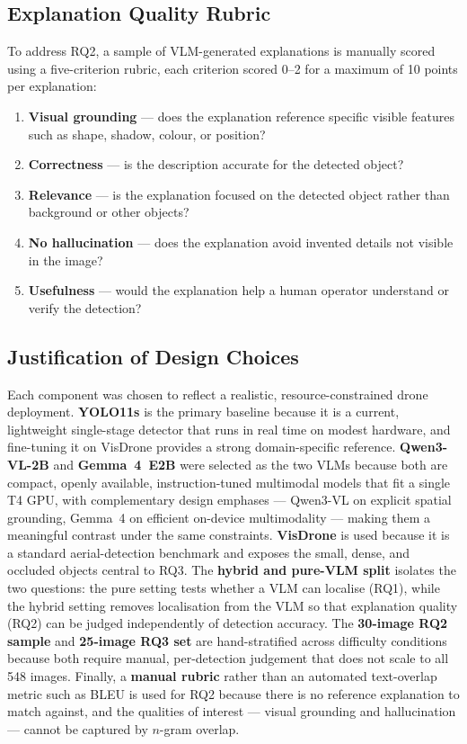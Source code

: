 \documentclass[acmtog, authorversion]{acmart}
\begin{document}
\subsection{Explanation Quality Rubric}

To address RQ2, a sample of VLM-generated explanations is manually
scored using a five-criterion rubric, each criterion scored 0--2
for a maximum of 10 points per explanation:

\begin{enumerate}
  \item \textbf{Visual grounding} --- does the explanation reference
    specific visible features such as shape, shadow, colour, or
    position?
  \item \textbf{Correctness} --- is the description accurate for the
    detected object?
  \item \textbf{Relevance} --- is the explanation focused on the
    detected object rather than background or other objects?
  \item \textbf{No hallucination} --- does the explanation avoid
    invented details not visible in the image?
  \item \textbf{Usefulness} --- would the explanation help a human
    operator understand or verify the detection?
\end{enumerate}

\subsection{Justification of Design Choices}
Each component was chosen to reflect a realistic, resource-constrained
drone deployment. \textbf{YOLO11s} is the primary baseline because it
is a current, lightweight single-stage detector that runs in real time
on modest hardware, and fine-tuning it on VisDrone provides a strong
domain-specific reference. \textbf{Qwen3-VL-2B} and \textbf{Gemma~4~E2B}
were selected as the two VLMs because both are compact, openly
available, instruction-tuned multimodal models that fit a single T4
GPU, with complementary design emphases --- Qwen3-VL on explicit
spatial grounding, Gemma~4 on efficient on-device multimodality ---
making them a meaningful contrast under the same constraints.
\textbf{VisDrone} is used because it is a standard aerial-detection
benchmark and exposes the small, dense, and occluded objects central to
RQ3. The \textbf{hybrid and pure-VLM split} isolates the two questions:
the pure setting tests whether a VLM can localise (RQ1), while the
hybrid setting removes localisation from the VLM so that explanation
quality (RQ2) can be judged independently of detection accuracy. The
\textbf{30-image RQ2 sample} and \textbf{25-image RQ3 set} are
hand-stratified across difficulty conditions because both require
manual, per-detection judgement that does not scale to all 548 images.
Finally, a \textbf{manual rubric} rather than an automated text-overlap
metric such as BLEU is used for RQ2 because there is no reference
explanation to match against, and the qualities of interest --- visual
grounding and hallucination --- cannot be captured by $n$-gram overlap.
\end{document}
